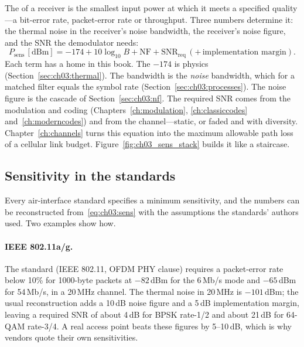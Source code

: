 The  of a receiver is the smallest input power at which it meets a specified
quality---a bit-error rate, packet-error rate or throughput. Three numbers determine it: the thermal noise
in the receiver's noise bandwidth, the receiver's noise figure, and the SNR the demodulator needs:
\begin{equation}
P_{\text{sens}}\,[\mathrm{dBm}]=-174+10\log_{10}B+\mathrm{NF}+\mathrm{SNR}_{\text{req}}\,(+\,\text{implementation margin}).
\label{eq:ch03:sens}
\end{equation}
Each term has a home in this book. The $-174$ is physics (Section~\ref{sec:ch03:thermal}). The bandwidth
is the \emph{noise} bandwidth, which for a matched filter equals the symbol rate
(Section~\ref{sec:ch03:processes}). The noise figure is the cascade of Section~\ref{sec:ch03:nf}. The
required SNR comes from the modulation and coding (Chapters~\ref{ch:modulation}, \ref{ch:classiccodes}
and~\ref{ch:moderncodes}) and from the channel---static, or faded and with diversity.
Chapter~\ref{ch:channels} turns this equation into the maximum allowable path loss of a cellular link
budget. Figure~\ref{fig:ch03_sens_stack} builds it like a staircase.

\subsection{Sensitivity in the standards}

Every air-interface standard specifies a minimum sensitivity, and the numbers can be reconstructed
from~\eqref{eq:ch03:sens} with the assumptions the standards' authors used. Two examples show how.


\paragraph{IEEE 802.11a/g.} The standard (IEEE 802.11, OFDM PHY clause) requires a packet-error rate below
10\% for 1000-byte packets at $-82$\,dBm for the 6\,Mb/s mode and $-65$\,dBm for 54\,Mb/s, in a 20\,MHz
channel. The thermal noise in 20\,MHz is $-101$\,dBm; the usual reconstruction adds a 10\,dB noise figure
and a 5\,dB implementation margin, leaving a required SNR of about 4\,dB for BPSK rate-1/2 and about 21\,dB
for 64-QAM rate-3/4. A real access point beats these figures by 5--10\,dB, which is why vendors quote their
own sensitivities.

